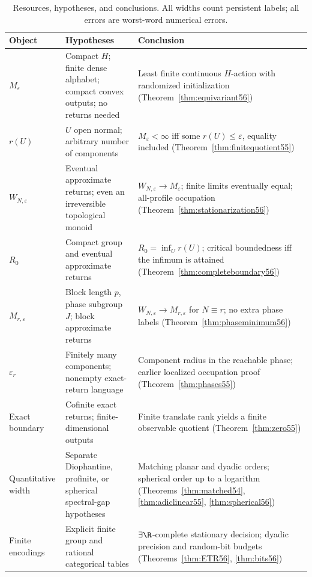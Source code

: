 \clearpage
\begin{table}[p]
\centering\small
\caption{Resources, hypotheses, and conclusions. All widths count persistent labels; all errors are worst-word numerical errors.}\label{tab:map56}
\begin{tabular}{p{}p{}p{}}
\toprule
Object & Hypotheses & Conclusion\\
\midrule
$M_\varepsilon$ & Compact $H$; finite dense alphabet; compact convex outputs; no returns needed & Least finite continuous $H$-action with randomized initialization (Theorem~\ref{thm:equivariant56})\\[5pt]
$r(U)$ & $U$ open normal; arbitrary number of components & $M_\varepsilon<\infty$ iff some $r(U)\le\varepsilon$, equality included (Theorem~\ref{thm:finitequotient55})\\[5pt]
$W_{N,\varepsilon}$ & Eventual approximate returns; even an irreversible topological monoid & $W_{N,\varepsilon}\to M_\varepsilon$; finite limits eventually equal; all-profile occupation (Theorem~\ref{thm:stationarization56})\\[5pt]
$R_0$ & Compact group and eventual approximate returns & $R_0=\inf_Ur(U)$; critical boundedness iff the infimum is attained (Theorem~\ref{thm:completeboundary56})\\[5pt]
$M_{r,\varepsilon}$ & Block length $p$, phase subgroup $J$; block approximate returns & $W_{N,\varepsilon}\to M_{r,\varepsilon}$ for $N\equiv r$; no extra phase labels (Theorem~\ref{thm:phaseminimum56})\\[5pt]
$\varepsilon_r$ & Finitely many components; nonempty exact-return language & Component radius in the reachable phase; earlier localized occupation proof (Theorem~\ref{thm:phases55})\\[5pt]
Exact boundary & Cofinite exact returns; finite-dimensional outputs & Finite translate rank yields a finite observable quotient (Theorem~\ref{thm:zero55})\\[5pt]
Quantitative width & Separate Diophantine, profinite, or spherical spectral-gap hypotheses & Matching planar and dyadic orders; spherical order up to a logarithm (Theorems~\ref{thm:matched54}, \ref{thm:adiclinear55}, \ref{thm:spherical56})\\[5pt]
Finite encodings & Explicit finite group and rational categorical tables & $\exists\R$-complete stationary decision; dyadic precision and random-bit budgets (Theorems~\ref{thm:ETR56}, \ref{thm:bits56})\\
\bottomrule
\end{tabular}
\end{table}
\clearpage

